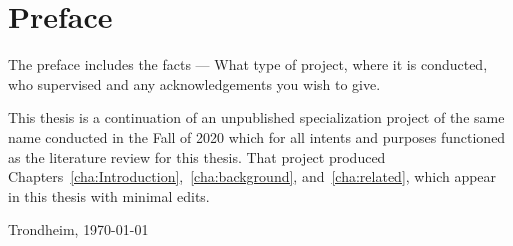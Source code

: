 \chapter*{Preface}
\vspace{1cm}
The preface includes the facts --- What type of project, where it is conducted, who supervised and any acknowledgements you wish to give.

This thesis is a continuation of an unpublished specialization project of the same name conducted in the Fall of 2020 which for all intents and purposes functioned as the literature review for this thesis. That project produced Chapters~\ref{cha:Introduction},~\ref{cha:background}, and~\ref{cha:related}, which appear in this thesis with minimal edits.
\vfill
\begin{flushright}
    \thesisAuthor\par
    Trondheim, {\usdate\today}
\end{flushright}
